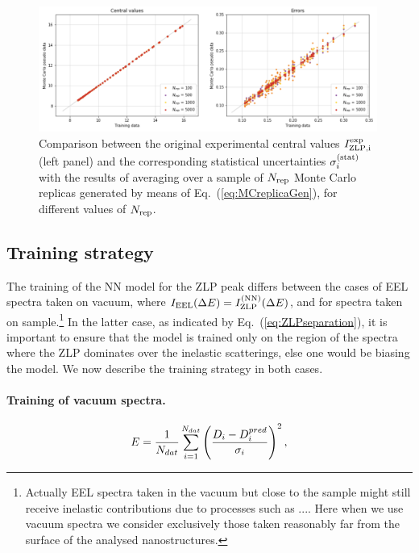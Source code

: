 \begin{figure}[t]
    \centering
    \includegraphics[width=0.99\textwidth]{plots/MC.png}
    \caption{Comparison between the original experimental central values
      $I_{\rm ZLP,i}^{\rm exp}$ (left panel) and the corresponding statistical
      uncertainties $\sigma_i^{(\rm stat)}$ with the results of averaging over
      a sample of $N_{\rm rep}$ Monte Carlo replicas generated by means of
      Eq.~(\ref{eq:MCreplicaGen}), for different values of
      $N_{\rm rep}$.
      }
    \label{fig:MC}
\end{figure}


\subsection{Training strategy}

The training of the NN model for the ZLP peak differs between
the cases of EEL spectra taken on vacuum, where $I_{\rm EEL}(\Delta E) =I_{\rm ZLP}^{\rm (NN)}(\Delta E)$,
and for spectra taken on sample.\footnote{Actually EEL spectra taken in the vacuum but close
  to the sample might still receive inelastic contributions due to processes such as .... Here
  when we use vacuum spectra we consider exclusively those taken reasonably far from the surface
of the analysed nanostructures.}
%
In the latter case, as indicated by Eq.~(\ref{eq:ZLPseparation}), it is
important to ensure that the model is trained only on the region of the spectra
where the ZLP dominates over the inelastic scatterings, else one would be biasing
the model.
%
We now describe the training strategy in both cases.

\paragraph{Training of vacuum spectra.}
%

\begin{equation}\label{eq:chi2}
\begin{centering}
    E = \frac{1}{N_{dat}}\sum_{i=1}^{N_{dat}}\left(\frac{D_i - D_i^{pred}}{\sigma_i}\right)^2, 
\end{centering}
\end{equation}

